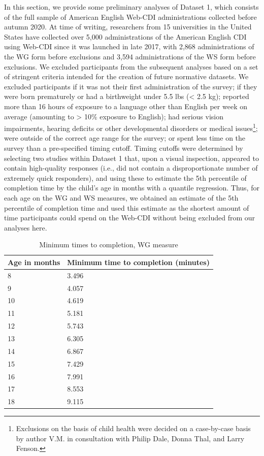 \documentclass[
  english,
  ,man,floatsintext]{apa6}
\begin{document}
In this section, we provide some preliminary analyses of Dataset 1, which consists of the full sample of American English Web-CDI administrations collected before autumn 2020. At time of writing, researchers from 15 universities in the United States have collected over 5,000 administrations of the American English CDI using Web-CDI since it was launched in late 2017, with 2,868 administrations of the WG form before exclusions and 3,594 administrations of the WS form before exclusions. We excluded participants from the subsequent analyses based on a set of stringent criteria intended for the creation of future normative datasets. We excluded participants if it was not their first administration of the survey; if they were born prematurely or had a birthweight under 5.5 lbs (\textless{} 2.5 kg); reported more than 16 hours of exposure to a language other than English per week on average (amounting to \textgreater{} 10\% exposure to English); had serious vision impairments, hearing deficits or other developmental disorders or medical issues\footnote{Exclusions on the basis of child health were decided on a case-by-case basis by author V.M. in consultation with Philip Dale, Donna Thal, and Larry Fenson.}; were outside of the correct age range for the survey; or spent less time on the survey than a pre-specified timing cutoff. Timing cutoffs were determined by selecting two studies within Dataset 1 that, upon a visual inspection, appeared to contain high-quality responses (i.e., did not contain a disproportionate number of extremely quick responders), and using these to estimate the 5th percentile of completion time by the child's age in months with a quantile regression. Thus, for each age on the WG and WS measures, we obtained an estimate of the 5th percentile of completion time and used this estimate as the shortest amount of time participants could spend on the Web-CDI without being excluded from our analyses here.

\begin{table}

\caption{\label{tab:unnamed-chunk-2}Minimum times to completion, WG measure}
\centering
\begin{tabular}[t]{l|l}
\hline
Age in months & Minimum time to completion (minutes)\\
\hline
8 & 3.496\\
\hline
9 & 4.057\\
\hline
10 & 4.619\\
\hline
11 & 5.181\\
\hline
12 & 5.743\\
\hline
13 & 6.305\\
\hline
14 & 6.867\\
\hline
15 & 7.429\\
\hline
16 & 7.991\\
\hline
17 & 8.553\\
\hline
18 & 9.115\\
\hline
\end{tabular}
\end{table}
\end{document}
